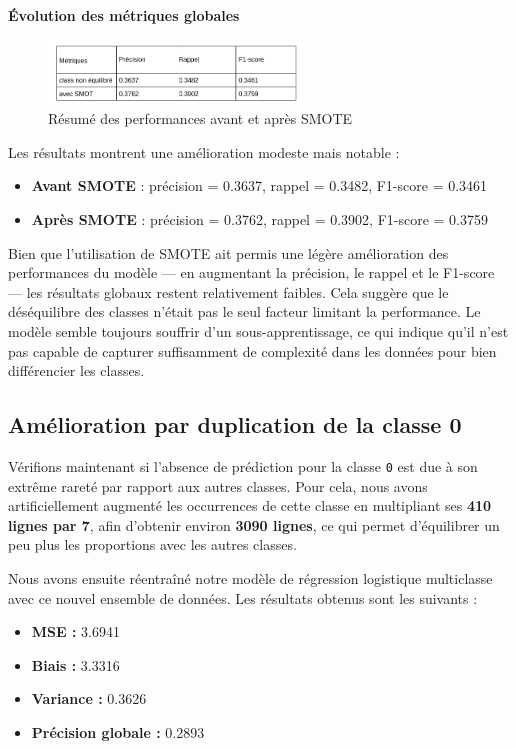 \documentclass[a4paper,12pt]{article}
\begin{document}
\vspace{0.5em}
\noindent\textbf{Évolution des métriques globales}

\begin{figure}[H]
    \centering
    \includegraphics[width=0.6\textwidth]{resultats_smote_tableau.png}
    \caption{Résumé des performances avant et après SMOTE}
    \label{fig:smote_tableau}
\end{figure}

Les résultats montrent une amélioration modeste mais notable :
\begin{itemize}
    \item \textbf{Avant SMOTE} : précision = 0.3637, rappel = 0.3482, F1-score = 0.3461
    \item \textbf{Après SMOTE} : précision = 0.3762, rappel = 0.3902, F1-score = 0.3759
\end{itemize}

Bien que l'utilisation de SMOTE ait permis une légère amélioration des performances du modèle — en augmentant la précision, le rappel et le F1-score — les résultats globaux restent relativement faibles. Cela suggère que le déséquilibre des classes n'était pas le seul facteur limitant la performance. Le modèle semble toujours souffrir d’un sous-apprentissage, ce qui indique qu’il n’est pas capable de capturer suffisamment de complexité dans les données pour bien différencier les classes. 

\subsection{Amélioration par duplication de la classe 0}

Vérifions maintenant si l’absence de prédiction pour la classe \texttt{0} est due à son extrême rareté par rapport aux autres classes. Pour cela, nous avons artificiellement augmenté les occurrences de cette classe en multipliant ses \textbf{410 lignes par 7}, afin d’obtenir environ \textbf{3090 lignes}, ce qui permet d’équilibrer un peu plus les proportions avec les autres classes.

Nous avons ensuite réentraîné notre modèle de régression logistique multiclasse avec ce nouvel ensemble de données. Les résultats obtenus sont les suivants :
\begin{itemize}
    \item \textbf{MSE :} 3.6941
    \item \textbf{Biais :} 3.3316
    \item \textbf{Variance :} 0.3626
    \item \textbf{Précision globale :} 0.2893
\end{itemize}
\end{document}
